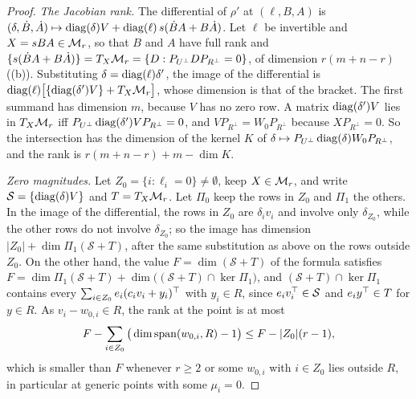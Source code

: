 \begin{proof}
\emph{The Jacobian rank.} The differential of $\rho'$ at $(\ell,B,A)$ is
$(\delta,\dot B,\dot A)\mapsto\operatorname{diag}(\delta)V+\operatorname{diag}(\ell)\,s(\dot BA+B\dot A)$. Let $\ell$ be invertible and $X=sBA\in\mathcal{M}_r$, so
that $B$ and $A$ have full rank and $\{s(\dot BA+B\dot A)\}=T_X\mathcal{M}_r=\{D:P_{U^\perp}DP_{R^\perp}=0\}$, of dimension
$r(m+n-r)$ ((b)). Substituting $\delta=\operatorname{diag}(\ell)\delta'$, the image of the differential is
$\operatorname{diag}(\ell)\big[\{\operatorname{diag}(\delta')V\}+T_X\mathcal{M}_r\big]$, whose dimension is that of the bracket. The first summand has dimension
$m$, because $V$ has no zero row. A matrix $\operatorname{diag}(\delta')V$ lies in $T_X\mathcal{M}_r$ iff
$P_{U^\perp}\operatorname{diag}(\delta')VP_{R^\perp}=0$, and $VP_{R^\perp}=W_0P_{R^\perp}$ because $XP_{R^\perp}=0$. So the intersection
has the dimension of the kernel $K$ of $\delta\mapsto P_{U^\perp}\operatorname{diag}(\delta)W_0P_{R^\perp}$, and the rank is
$r(m+n-r)+m-\dim K$.

\emph{Zero magnitudes.} Let $Z_0=\{i:\ell_i=0\}\ne\emptyset$, keep $X\in\mathcal{M}_r$, and write $\mathcal S=\{\operatorname{diag}(\delta)V\}$
and $T=T_X\mathcal{M}_r$. Let $\Pi_0$ keep the rows in $Z_0$ and $\Pi_1$ the others. In the image of the differential, the rows in
$Z_0$ are $\delta_iv_i$ and involve only $\delta_{Z_0}$, while the other rows do not involve $\delta_{Z_0}$; so the image has
dimension $\lvert Z_0\rvert+\dim\Pi_1(\mathcal S+T)$, after the same substitution as above on the rows outside $Z_0$. On the
other hand, the value $F=\dim(\mathcal S+T)$ of the formula satisfies $F=\dim\Pi_1(\mathcal S+T)+\dim\big((\mathcal S+T)\cap
\ker\Pi_1\big)$, and $(\mathcal S+T)\cap\ker\Pi_1$ contains every $\sum_{i\in Z_0}e_i(c_iv_i+y_i)^{\top}$ with $y_i\in R$, since
$e_iv_i^{\top}\in\mathcal S$ and $e_iy^{\top}\in T$ for $y\in R$. As $v_i-w_{0,i}\in R$, the rank at the point is at most
\begin{equation*}
  F-\sum_{i\in Z_0}\big(\dim\operatorname{span}(w_{0,i},R)-1\big)\le F-\lvert Z_0\rvert(r-1),
\end{equation*}
which is smaller than $F$ whenever $r\ge2$ or some $w_{0,i}$ with $i\in Z_0$ lies outside $R$, in particular at generic
points with some $\mu_i=0$.


\end{proof}
